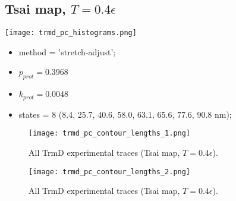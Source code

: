 \subsection{Tsai map, $T=0.4\epsilon$}
\label{subsec:trmd-pc}
\begin{minipage}[c]{0.7\textwidth}
    \texttt{[image: trmd\_pc\_histograms.png]}
\end{minipage}
\hfill
\begin{minipage}[c]{0.45\textwidth}
    \begin{itemize}
        \item method = 'stretch-adjust';
        \item $p_{prot}=0.3968$
        \item $k_{prot}=0.0048$
        \item states = 8 (8.4, 25.7, 40.6, 58.0, 63.1, 65.6, 77.6, 90.8 nm);
    \end{itemize}
\end{minipage}

\begin{figure}
    \centering
    \texttt{[image: trmd\_pc\_contour\_lengths\_1.png]}
    \caption{All TrmD experimental traces (Tsai map, $T=0.4\epsilon$).}
    \label{fig:trmd-pc-cl1}
\end{figure}

\begin{figure}
    \centering
    \texttt{[image: trmd\_pc\_contour\_lengths\_2.png]}
    \caption{All TrmD experimental traces (Tsai map, $T=0.4\epsilon$).}
    \label{fig:trmd-pc-cl2}
\end{figure}

